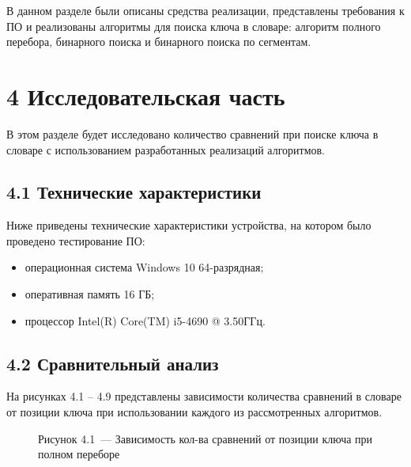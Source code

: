 \documentclass[12pt, a4paper]{report}
\begin{document}
	В данном разделе были описаны средства реализации, представлены требования к ПО и реализованы алгоритмы для поиска ключа в словаре: алгоритм полного перебора, бинарного поиска и бинарного поиска по сегментам.
	
	\chapter*{4 Исследовательская часть}
	
	В этом разделе будет исследовано количество сравнений при поиске ключа в словаре с использованием разработанных реализаций алгоритмов.
	
	\section*{4.1 Технические характеристики}
	
	Ниже приведены технические характеристики устройства, на котором было проведено тестирование ПО:
	
	\begin{itemize}
		\item операционная система Windows 10 64-разрядная;
		\item оперативная память 16 ГБ;
		\item процессор Intel(R) Core(TM) i5-4690 @ 3.50ГГц.
	\end{itemize}
	
	\section*{4.2 Сравнительный анализ}
	
	На рисунках 4.1 -- 4.9 представлены зависимости количества сравнений в словаре от позиции ключа при использовании каждого из рассмотренных алгоритмов.
	
	\begin{figure}[H]
		\caption*{Рисунок 4.1~--- Зависимость кол-ва сравнений от позиции ключа при полном переборе}
	\end{figure}
	
\end{document}
